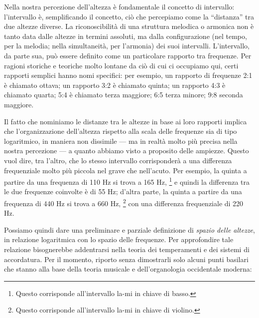 Nella nostra percezione dell'altezza è fondamentale il concetto di intervallo: l'intervallo è, semplificando il concetto, ciò che percepiamo come la ``distanza'' tra due altezze diverse. La riconoscibilità di una struttura melodica o armonica non è tanto data dalle altezze in termini assoluti, ma dalla configurazione (nel tempo, per la melodia; nella simultaneità, per l'armonia) dei suoi intervalli. L'intervallo, da parte sua, può essere definito come un particolare rapporto tra frequenze. Per ragioni storiche e teoriche molto lontane da ciò di cui ci occupiamo qui, certi rapporti semplici hanno nomi specifici: per esempio, un rapporto di frequenze 2:1 è chiamato ottava; un rapporto 3:2 è chiamato quinta; un rapporto 4:3 è chiamato quarta; 5:4 è chiamato terza maggiore; 6:5 terza minore; 9:8 seconda maggiore.%

Il fatto che nominiamo le distanze tra le altezze in base ai loro rapporti implica che l'organizzazione dell'altezza rispetto alla scala delle frequenze sia di tipo logaritmico, in maniera non dissimile --- ma in realtà molto più precisa nella nostra percezione --- a quanto abbiamo visto a proposito delle ampiezze. Questo vuol dire, tra l'altro, che lo stesso intervallo corrisponderà a una differenza frequenziale molto più piccola nel grave che nell'acuto. Per esempio, la quinta a partire da una frequenza di 110 Hz si trova a 165 Hz,%
\footnote{Questo corrisponde all'intervallo la-mi in chiave di basso.}
e quindi la differenza tra le due frequenze coinvolte è di 55 Hz; d'altra parte, la quinta a partire da una frequenza di 440 Hz si trova a 660 Hz,
\footnote{Questo corrisponde all'intervallo la-mi in chiave di violino.}
con una differenza frequenziale di 220 Hz.

Possiamo quindi dare una preliminare e parziale definizione di \emph{spazio delle altezze}, in relazione logaritmica con lo spazio delle frequenze. Per approfondire tale relazione bisognerebbe addentrarsi nella teoria dei temperamenti e dei sistemi di accordatura. Per il momento, riporto senza dimostrarli solo alcuni punti basilari che stanno alla base della teoria musicale e dell'organologia occidentale moderna:

